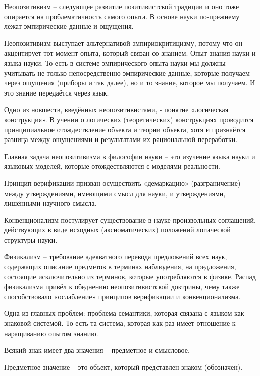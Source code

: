 \documentclass[exam_answers.tex]{subfiles}
\begin{document}
\renewcommand{\baselinestretch}{0.75}

Неопозитивизм – следующее развитие позитивистской традиции и оно тоже опирается на проблематичность самого опыта.
В основе науки по-прежнему лежат эмпирические данные и ощущения.

Неопозитивизм выступает альтернативой эмпириокритицизму, потому что он акцентирует тот момент опыта, который связан со знанием.
Опыт знания науки и языка науки.
То есть в системе эмпирического опыта науки мы должны учитывать не только непосредственно эмпирические данные, которые получаем через ощущения (приборы и так далее), но и то знание, которое мы получаем.
И это знание передаётся через язык.

Одно из новшеств, введённых неопозитивистами, - понятие «логическая конструкция».
В учении о логических (теоретических) конструкциях проводится принципиальное отождествление объекта и теории объекта, хотя и признаётся разница между ощущениями и результатами их рациональной переработки.

Главная задача неопозитивизма в философии науки – это изучение языка науки и языковых моделей, которые отождествляются с моделями реальности.

Принцип верификации призван осуществить «демаркацию» (разграничение) между утверждениями, имеющими смысл для науки, и утверждениями, лишёнными научного смысла.

Конвенционализм постулирует существование в науке произвольных соглашений, действующих в виде исходных (аксиоматических) положений логической структуры науки.

Физикализм – требование адекватного перевода предложений всех наук, содержащих описание предметов в терминах наблюдения, на предложения, состоящие исключительно из терминов, которые употребляются в физике.
Распад физикализма привёл к обеднению неопозитивистской доктрины, чему также способствовало «ослабление» принципов верификации и конвенционализма.

Одна из главных проблем: проблема семантики, которая связана с языком как знаковой системой.
То есть та система, которая как раз имеет отношение к наращиванию опытом знанию.

Всякий знак имеет два значения – предметное и смысловое.

Предметное значение – это объект, который представлен знаком (обозначен).
\end{document}
